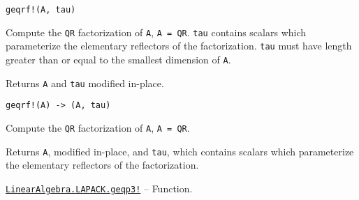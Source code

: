 \begin{adjustwidth}{2em}{0pt}


\begin{verbatim}
geqrf!(A, tau)
\end{verbatim}

Compute the \texttt{QR} factorization of \texttt{A}, \texttt{A = QR}. \texttt{tau} contains scalars which parameterize the elementary reflectors of the factorization. \texttt{tau} must have length greater than or equal to the smallest dimension of \texttt{A}.

Returns \texttt{A} and \texttt{tau} modified in-place.




\begin{lstlisting}
geqrf!(A) -> (A, tau)
\end{lstlisting}

Compute the \texttt{QR} factorization of \texttt{A}, \texttt{A = QR}.

Returns \texttt{A}, modified in-place, and \texttt{tau}, which contains scalars which parameterize the elementary reflectors of the factorization.



\end{adjustwidth}
\hypertarget{18183103848385216109}{} 
\hyperlink{18183103848385216109}{\texttt{LinearAlgebra.LAPACK.geqp3!}}  -- {Function.}


